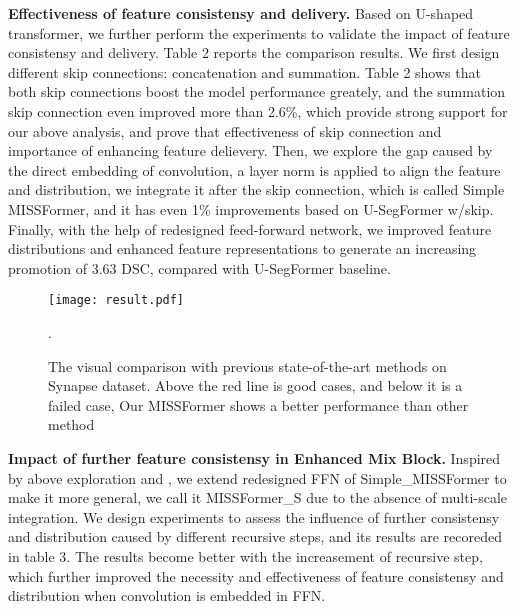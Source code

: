 \documentclass[letterpaper]{article} \usepackage{aaai22}  \usepackage{times}  \usepackage{helvet}  \usepackage{courier}  \usepackage[hyphens]{url}  \usepackage{graphicx} \urlstyle{rm} \def\UrlFont{\rm}  \usepackage{natbib}  \usepackage{caption} \DeclareCaptionStyle{ruled}{labelfont=normalfont,labelsep=colon,strut=off} \frenchspacing  \setlength{\pdfpagewidth}{8.5in}  \setlength{\pdfpageheight}{11in}  \usepackage{algorithm}
\begin{document}
\textbf{Effectiveness of feature consistensy and delivery.} Based on U-shaped transformer, we further perform the experiments to validate the impact of feature consistensy and delivery. Table 2 reports the comparison results. We first design different skip connections: concatenation and summation. Table 2 shows that both skip connections boost the model performance greately, and the summation skip connection even improved more than 2.6\%, which provide strong support for our above analysis, and prove that effectiveness of skip connection and importance of enhancing feature delievery. Then, we explore the gap caused by the direct embedding of convolution, a layer norm is applied to align the feature and distribution, we integrate it after the skip connection, which is called Simple  MISSFormer, and it has even 1\% improvements based on U-SegFormer w/skip. Finally, with the help of redesigned feed-forward network, we improved feature distributions and enhanced feature representations to generate an increasing promotion of 3.63 DSC, compared with U-SegFormer baseline.
\begin{figure*}[t]
	\centering
	\texttt{[image: result.pdf]} \caption{The visual comparison with previous state-of-the-art methods on Synapse dataset. Above the red line is good cases, and below it is a failed case, Our MISSFormer shows a better performance than other method}.
	\label{fig3}
\end{figure*}

\textbf{Impact of further feature consistensy in Enhanced Mix Block.} Inspired by above exploration and \cite{liu2020rethinking}, we extend redesigned FFN of Simple\_MISSFormer to make it more general, we call it MISSFormer\_S due to the absence of multi-scale integration. We design experiments to assess the influence of further consistensy and distribution caused by different recursive steps, and its results are recoreded in table 3. The results become better with the increasement of recursive step, which further improved the necessity and effectiveness of feature consistensy and distribution when convolution is embedded in FFN.
\end{document}
